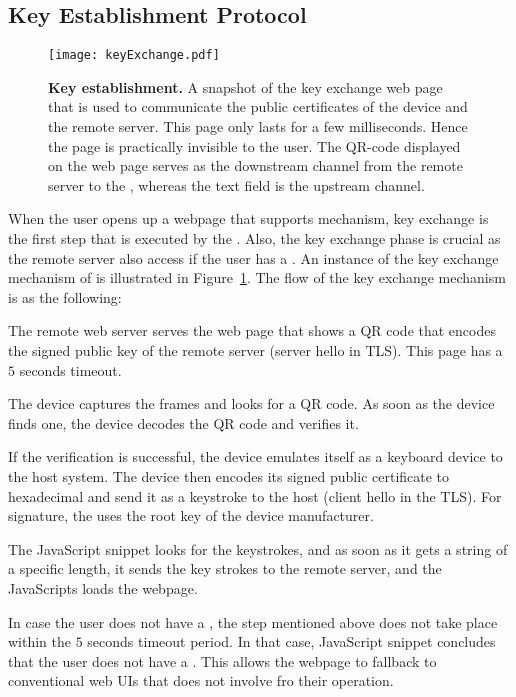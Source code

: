 \subsection{Key Establishment Protocol}
\label{sec:systemDesign:keyEstablishment}

\begin{figure}[t]
\centering
\texttt{[image: keyExchange.pdf]}
\caption{\textbf{Key establishment.} A snapshot of the key exchange web page that is used to communicate the public certificates of the device and the remote server. This page only lasts for a few milliseconds. Hence the page is practically invisible to the user. The QR-code displayed on the web page serves as the downstream channel from the remote server to the \device, whereas the text field is the upstream channel.}
\label{fig:keyExchange}
\centering
\end{figure}


When the user opens up a webpage that supports \name mechanism, key exchange is the first step that is executed by the \device. Also, the key exchange phase is crucial as the remote server also access if the user has a \device. An instance of the key exchange mechanism of \name is illustrated in Figure~\ref{fig:keyExchange}. The flow of the key exchange mechanism is as the following:

\begin{mylist}
  \item The remote web server serves the web page that shows a QR code that encodes the signed public key of the remote server (server hello in TLS). This page has a $5$ seconds timeout.
  \item The device captures the frames and looks for a QR code. As soon as the device finds one, the device decodes the QR code and verifies it.
  \item If the verification is successful, the device emulates itself as a keyboard device to the host system. The device then encodes its signed public certificate to hexadecimal and send it as a keystroke to the host (client hello in the TLS). For signature, the \device uses the root key of the device manufacturer.
  \item The \name  JavaScript snippet looks for the keystrokes, and as soon as it gets a string of a specific length, it sends the key strokes to the remote server, and the \name JavaScripts loads the webpage.
  \item In case the user does not have a \device, the step mentioned above does not take place within the $5$ seconds timeout period. In that case, \name JavaScript snippet concludes that the user does not have a \device. This allows the webpage to fallback to conventional web UIs that does not involve \device fro their operation.
\end{mylist}

